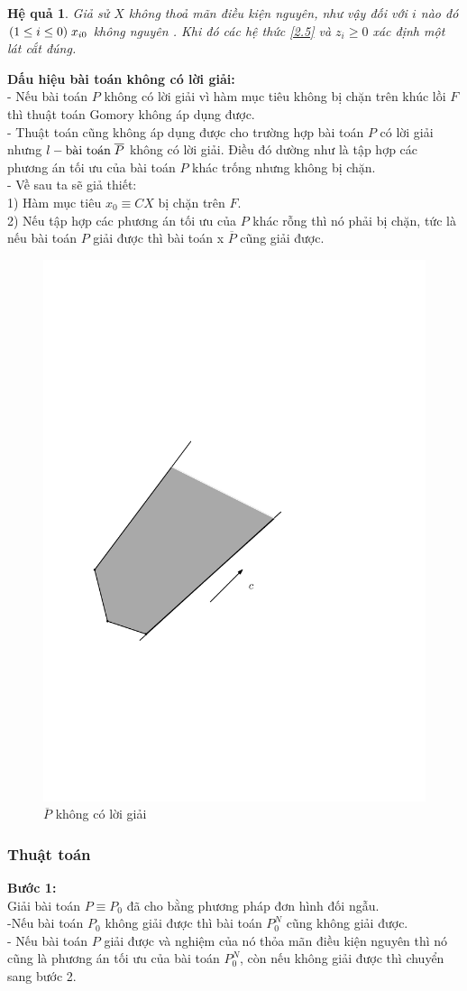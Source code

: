 \documentclass[12pt,a4paper]{report}
\newtheorem{hq}{Hệ quả}
\begin{document}
    \begin{hq}
        Giả sử $X$ không thoả mãn điều kiện nguyên, như vậy đối 
với $i$ nào đó $(1\le i \le 0) \hspace{0.1cm} x_{i0}$ không nguyên . Khi đó các hệ thức \eqref{2.5}  và $z_i \ge 0$ xác định một lát cắt đúng.
    \end{hq} 
    
    \textbf{Dấu hiệu bài toán không có lời giải:}\\
    - Nếu bài toán $P$ không có lời giải vì hàm mục tiêu không bị chặn trên khúc lồi $F$ thì thuật toán Gomory không áp dụng được.\\
- Thuật toán cũng không áp dụng được cho trường hợp bài toán $P$ có lời giải nhưng $l-\text{bài toán} \hspace{0.1cm} \overline{P}$ không có lời giải. Điều đó dường như là tập hợp các phương án tối ưu của bài toán $P$ khác trống nhưng không bị chặn.\\
- Về sau ta sẽ giả thiết:\\
1) Hàm mục tiêu $x_0\equiv CX$ bị chặn trên $F$.\\
2) Nếu tập hợp các phương án tối ưu của $P$ khác rỗng thì nó phải bị chặn, tức là nếu bài toán $P$ giải được thì bài toán x $\overline{P}$ cũng giải 
được.\\

\begin{figure}[h]
\centering
\includegraphics[width=0.3\linewidth]{anh3.pdf}
\caption{$\overline{P}$ không có lời giải}
\end{figure}
\subsubsection{ Thuật toán}

\textbf{Bước 1:}\\
Giải bài toán $P\equiv P_0$ đã cho bằng phương pháp đơn hình đối ngẫu.\\
-Nếu bài toán $P_0$ không giải được thì bài toán $P_0^N$ cũng không giải được.\\
- Nếu bài toán $P$ giải được và nghiệm của nó thỏa mãn điều kiện nguyên thì nó cũng là phương án tối ưu của bài toán $P^N_0$, còn nếu không giải được thì chuyển sang bước 2.\\
\end{document}
